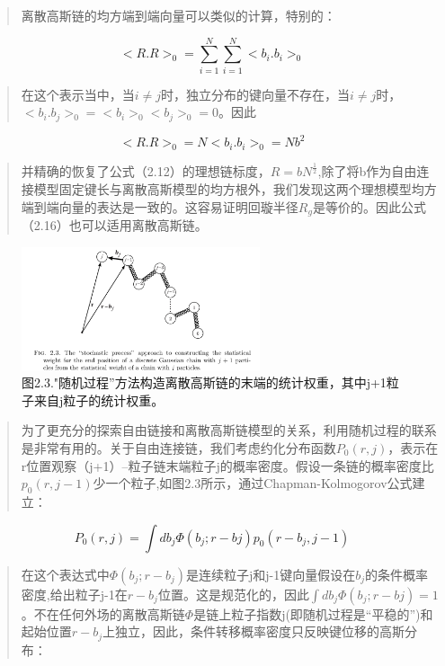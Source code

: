 \begin{quotation}
离散高斯链的均方端到端向量可以类似的计算，特别的：
\end{quotation}
\begin{equation}
<R.R>_{0}=\sum_{i=1}^{N}\sum_{i=1}^{N}<b_{i}.b_{i}>_{0}
\end{equation}
\begin{quotation}
在这个表示当中，当$i\neq j$时，独立分布的键向量不存在，当$i\neq j$时，$<b_{i}.b_{j}>_{0}=<b_{i}>_{0}<b_{j}>_{0}=0$。因此
\end{quotation}
\begin{equation}
<R.R>_{0}=N<b_{i}.b_{i}>_{0}=Nb^2
\end{equation}
\begin{quotation}
并精确的恢复了公式（2.12）的理想链标度，$R=bN^\frac{1}{2}$,除了将b作为自由连接模型固定键长与离散高斯模型的均方根外，我们发现这两个理想模型均方端到端向量的表达是一致的。这容易证明回璇半径$R_{g}$是等价的。因此公式（2.16）也可以适用离散高斯链。
\end{quotation}
\begin{figure}
\centering
\includegraphics[width=7cm]{./figures/23.png}
\caption{图2.3."随机过程”方法构造离散高斯链的末端的统计权重，其中j+1粒子来自j粒子的统计权重。}
\end{figure}
\newpage
\begin{quotation}
为了更充分的探索自由链接和离散高斯链模型的关系，利用随机过程的联系是非常有用的。关于自由连接链，我们考虑约化分布函数$P_{0}(r,j)$，表示在r位置观察（j+1）--粒子链末端粒子j的概率密度。假设一条链的概率密度比$p_{0}(r,j-1)$少一个粒子,如图2.3所示，通过Chapman-Kolmogorov公式建立：
\end{quotation}
\begin{equation}
P_{0}(r,j)=\int db_{j} \varPhi (b_{j};r-b{j})p_{0}(r-b_{j},j-1)
\end{equation}
\begin{quotation}
在这个表达式中$\varPhi (b_{j};r-b_{j})$是连续粒子j和j-1键向量假设在$b_{j}$的条件概率密度,给出粒子j-1在$r-b_{j}$位置。这是规范化的，因此$\int db_{j} \varPhi (b_{j};r-b{j})=1$。不在任何外场的离散高斯链$\varPhi$是链上粒子指数j(即随机过程是“平稳的”)和起始位置$r-b_{j}$上独立，因此，条件转移概率密度只反映键位移的高斯分布：
\end{quotation}
